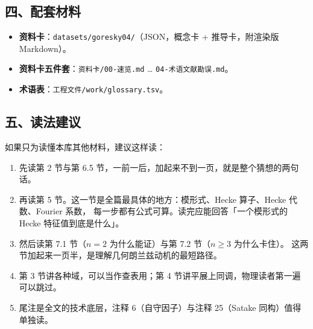 \subsection*{四、配套材料}

\begin{itemize}[leftmargin=2.2em,itemsep=2pt]
\item \textbf{资料卡}：\texttt{datasets/goresky04/}（JSON，概念卡 + 推导卡，附渲染版 Markdown）。
\item \textbf{资料卡五件套}：\texttt{资料卡/00-速览.md} … \texttt{04-术语文献勘误.md}。
\item \textbf{术语表}：\texttt{工程文件/work/glossary.tsv}。
\end{itemize}

\subsection*{五、读法建议}

如果只为读懂本库其他材料，建议这样读：

\begin{enumerate}[leftmargin=2.2em,itemsep=2pt]
\item 先读第 2 节与第 6.5 节，一前一后，加起来不到一页，就是整个猜想的两句话。
\item 再读第 5 节。这一节是全篇最具体的地方：模形式、Hecke 算子、Hecke 代数、Fourier 系数，
      每一步都有公式可算。读完应能回答「一个模形式的 Hecke 特征值到底是什么」。
\item 然后读第 7.1 节（$n=2$ 为什么能证）与第 7.2 节（$n\ge 3$ 为什么卡住）。
      这两节加起来一页半，是理解几何朗兰兹动机的最短路径。
\item 第 3 节讲各种域，可以当作查表用；第 4 节讲平展上同调，物理读者第一遍可以跳过。
\item 尾注是全文的技术底层，注释 6（自守因子）与注释 25（Satake 同构）值得单独读。
\end{enumerate}
